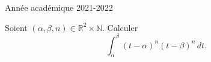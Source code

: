 \documentclass[a4paper, 11pt,openany]{book}%
\newtheorem[L]{thm}{Théorème}[section]
\newtheorem[M]{propo}[thm]{Proposition}
\newtheorem[M]{prop}[thm]{Propriété}
\newtheorem[M]{coro}[thm]{Corollaire}
\newtheorem[M]{lem}[thm]{Lemme}
\newtheorem[M,bodystyle=]{defi}[thm]{Définition}
\newtheorem[M,bodystyle=]{remark}[thm]{Remarque}
\newtheorem[M,bodystyle=]{met}[thm]{Méthode}
\newtheorem[M,bodystyle=]{ret}[thm]{A retenir}
\newtheorem[M,bodystyle=]{idee}[thm]{Idée}
\newtheorem[style=S,underline=false,bodystyle=]{exem}[thm]{Exemple}
\newtheorem[S,underline=false,bodystyle=]{exo}[thm]{Exercice}
\newtheorem[S,underline=false,bodystyle=]{appli}[thm]{Application}
\newtheorem[S,underline=false,bodystyle=]{sol}[thm]{Solution}
\newtheorem[S,underline=false,bodystyle=]{hypo}[thm]{Hypothesis}
\newtheorem[S,underline=false,bodystyle=]{nota}[thm]{Notation}
\begin{document}
\begin{titlepage}
\begin{sffamily}
\begin{center}

    \vfill

    {\large Année académique 2021-2022}

  \end{center}
  \end{sffamily}
\end{titlepage}



\begin{exo}

Soient $(\alpha, \beta, n) \in \mathbb{R}^2 \times \mathbb{N}$. Calculer 
\[ \int_{\alpha}^{\beta} (t-\alpha)^n (t - \beta)^n \, dt.\]

\end{exo}


\begin{sol}

%
\end{sol}
\end{document}
